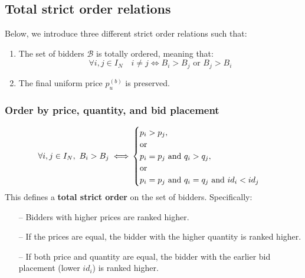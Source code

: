 
\subsection{Total strict order relations}
Below, we introduce three different strict order relations such that:
\begin{enumerate}
    \item The set of bidders $\mathcal{B}$ is totally ordered, meaning that:
    \begin{equation*}
        \forall i,j \in I_N \quad i \neq j \iff B_i > B_j \text{ or } B_j > B_i
    \end{equation*}
    \item The final uniform price $p_u^{(b)}$ is preserved.
\end{enumerate}

\subsubsection{Order by price, quantity, and bid placement}
\begin{equation*}
\forall i, j \in I_N, \ B_i > B_j \iff \\
\begin{cases} 
p_i > p_j,\\ 
\text{or} \\
p_i = p_j \text{ and } q_i > q_j, \\
\text{or} \\
p_i = p_j \text{ and } q_i = q_j \text{ and } id_i < id_j
\end{cases}
\end{equation*}
This defines a \textbf{total strict order} on the set of bidders. Specifically:
\begin{itemize}
    \setlength\itemsep{0em}
    \item[--] Bidders with higher prices are ranked higher.
    \item[--] If the prices are equal, the bidder with the higher quantity is ranked higher.
    \item[--] If both price and quantity are equal, the bidder with the earlier bid placement (lower $id_i$) is ranked higher.
\end{itemize}

